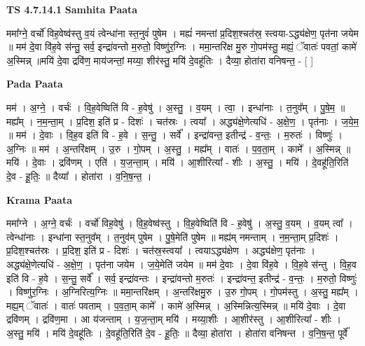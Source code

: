 \documentclass[17pt]{extarticle}
\begin{document}
\textbf{TS 4.7.14.1 } \newline
\textbf{Samhita Paata} \newline

ममा᳚ग्ने॒ वर्चो॑ विह॒वेष्व॑स्तु व॒यं त्वेन्धा॑ना स्त॒नुवं॑ पुषेम । मह्यं॑ नमन्तां प्र॒दिश॒श्चत॑स्र॒ स्त्वया-ऽद्ध्य॑क्षेण॒ पृत॑ना जयेम ॥ मम॑ दे॒वा वि॑ह॒वे स॑न्तु॒ सर्व॒ इन्द्रा॑वन्तो म॒रुतो॒ विष्णु॑र॒ग्निः । ममा॒न्तरि॑क्ष मु॒रु गो॒पम॑स्तु॒ मह्यं॒ ॅवातः॑ पवतां॒ कामे॑ अ॒स्मिन्न् ॥मयि॑ दे॒वा द्रवि॑ण॒ माय॑जन्तां॒ मय्या॒ शीर॑स्तु॒ मयि॑ दे॒वहू॑तिः । दैव्या॒ होता॑रा वनिषन्त॒ - [  ] \newline

\textbf{Pada Paata} \newline

मम॑ । अ॒ग्ने॒ । वर्चः॑ । वि॒ह॒वेष्विति॑ वि - ह॒वेषु॑ । अ॒स्तु॒ । व॒यम् । त्वा॒ । इन्धा॑नाः । त॒नुव᳚म् । पु॒षे॒म॒ ॥ मह्य᳚म् । न॒म॒न्ता॒म् । प्र॒दिश॒ इति॑ प्र - दिशः॑ । चत॑स्रः । त्वया᳚ । अद्ध्य॑क्षे॒णेत्यधि॑ - अ॒क्षे॒ण॒ । पृत॑नाः । ज॒ये॒म॒ ॥ मम॑ । दे॒वाः । वि॒ह॒व इति॑ वि - ह॒वे । स॒न्तु॒ । सर्वे᳚ । इन्द्रा॑वन्त॒ इतीन्द्र॑ - व॒न्तः॒ । म॒रुतः॑ । विष्णुः॑ । अ॒ग्निः ॥ मम॑ । अ॒न्तरि॑क्षम् । उ॒रु । गो॒पम् । अ॒स्तु॒ । मह्य᳚म् । वातः॑ । प॒व॒ता॒म् । कामे᳚ । अ॒स्मिन्न् ॥ मयि॑ । दे॒वाः । द्रवि॑णम् । एति॑ । य॒ज॒न्ता॒म् । मयि॑ । आ॒शीरित्या᳚ - शीः । अ॒स्तु॒ । मयि॑ । दे॒वहू॑ति॒रिति॑ दे॒व - हू॒तिः॒ ॥ दैव्या᳚ । होता॑रा । व॒नि॒ष॒न्त॒ ।  \newline


\textbf{Krama Paata} \newline

ममा᳚ग्ने । अ॒ग्ने॒ वर्चः॑ । वर्चो॑ विह॒वेषु॑ । वि॒ह॒वेष्व॑स्तु । वि॒ह॒वेष्विति॑ वि - ह॒वेषु॑ । अ॒स्तु॒ व॒यम् । व॒यम् त्वा᳚ । त्वेन्धा॑नाः । इन्धा॑ना स्त॒नुव᳚म् । त॒नुव॑म् पुषेम । पु॒षे॒मेति॑ पुषेम ॥ मह्य॑म् नमन्ताम् । न॒म॒न्ता॒म् प्र॒दिशः॑ । प्र॒दिश॒श्चत॑स्रः । प्र॒दिश॒ इति॑ प्र - दिशः॑ । चत॑स्र॒स्त्वया᳚ । त्वयाऽद्ध्य॑क्षेण । अद्ध्य॑क्षेण॒ पृत॑नाः । अद्ध्य॑क्षे॒णेत्यधि॑ - अ॒क्षे॒ण॒ । पृत॑ना जयेम । ज॒ये॒मेति॑ जयेम ॥ मम॑ दे॒वाः । दे॒वा वि॑ह॒वे । वि॒ह॒वे स॑न्तु । वि॒ह॒व इति॑ वि - ह॒वे । स॒न्तु॒ सर्वे᳚ । सर्व॒ इन्द्रा॑वन्तः । इन्द्रा॑वन्तो म॒रुतः॑ । इन्द्रा॑वन्त॒ इतीन्द्र॑ - व॒न्तः॒ । म॒रुतो॒ विष्णुः॑ । विष्णु॑र॒ग्निः । अ॒ग्निरित्य॒ग्निः ॥ ममा॒न्तरि॑क्षम् । अ॒न्तरि॑क्षमु॒रु । उ॒रु गो॒पम् । गो॒पम॑स्तु । अ॒स्तु॒ मह्य᳚म् । मह्य॒म् ॅवातः॑ । वातः॑ पवताम् । प॒व॒ता॒म् कामे᳚ । कामे॑ अ॒स्मिन्न् । अ॒स्मिन्नित्य॒स्मिन्न् ॥ मयि॑ दे॒वाः । दे॒वा द्रवि॑णम् । द्रवि॑ण॒मा । आ य॑जन्ताम् । य॒ज॒न्ता॒म् मयि॑ । मय्या॒शीः । आ॒शीर॑स्तु । आ॒शीरित्या᳚ - शीः । अ॒स्तु॒ मयि॑ । मयि॑ दे॒वहू॑तिः । दे॒वहू॑ति॒रिति॑ दे॒व - हू॒तिः॒ ॥ दैव्या॒ होता॑रा । होता॑रा वनिषन्त । व॒नि॒ष॒न्त॒ पूर्वे᳚ \newline
\end{document}
